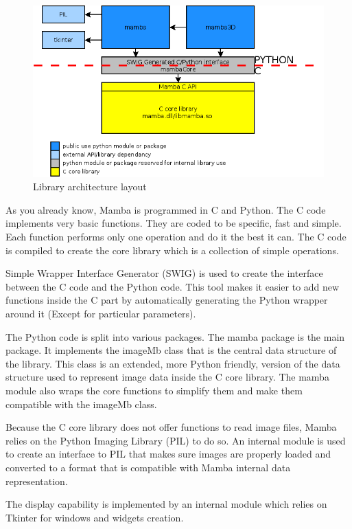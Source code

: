 \documentclass[a4paper,10pt,oneside]{article}
\begin{document}
\begin{figure}
\centering
\includegraphics[scale=0.5]{figures/archi.png}
\caption{Library architecture layout}
\label{fig:archi_lay}
\end{figure}

As you already know, Mamba is programmed in C and Python. The C code implements
very basic functions. They are coded to be specific, fast and simple. Each 
function performs only one operation and do it the best it can. The C code is 
compiled to create the core library which is a collection of simple operations.

Simple Wrapper Interface Generator (SWIG) is used to create the interface 
between the C code and the Python code. This tool makes it easier to add new
functions inside the C part by automatically generating the Python wrapper
around it (Except for particular parameters).

The Python code is split into various packages. The mamba package is the 
main package. It implements the imageMb class that is the
central data structure of the library. This class is an extended, more Python
friendly, version of the data structure used to represent image data inside the
C core library. The mamba module also wraps the core functions to simplify them
and make them compatible with the imageMb class.

Because the C core library does not offer functions to read image files, Mamba
relies on the Python Imaging Library (PIL) to do so. An internal module is used
to create an interface to PIL that makes sure images are properly loaded and
converted to a format that is compatible with Mamba internal data representation.

The display capability is implemented by an internal module which relies on
Tkinter for windows and widgets creation.
\end{document}
